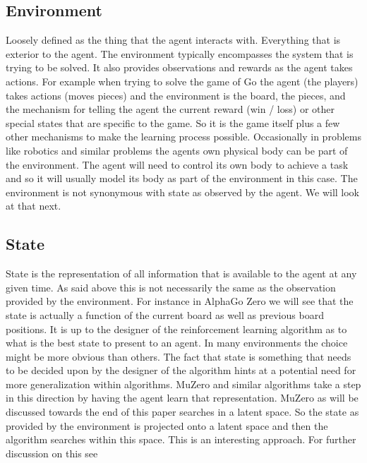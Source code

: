     \subsection{Environment}
    
    Loosely defined as the thing that the agent interacts with. Everything that is exterior to the agent. The environment typically encompasses the system that is trying to be solved. It also provides observations and rewards as the agent takes actions. For example when trying to solve the game of Go the agent (the players) takes actions (moves pieces) and the environment is the board, the pieces, and the mechanism for telling the agent the current reward (win / loss) or other special states that are specific to the game. So it is the game itself plus a few other mechanisms to make the learning process possible. Occasionally in problems like robotics and similar problems the agents own physical body can be part of the environment. The agent will need to control its own body to achieve a task and so it will usually model its body as part of the environment in this case. The environment is not synonymous with state as observed by the agent. We will look at that next. 
    
    \subsection{State}
    
    State is the representation of all information that is available to the agent at any given time. As said above this is not necessarily the same as the observation provided by the environment. For instance in AlphaGo Zero we will see that the state is actually a function of the current board as well as previous board positions. It is up to the designer of the reinforcement learning algorithm as to what is the best state to present to an agent. In many environments the choice might be more obvious than others. 
    The fact that state is something that needs to be decided upon by the designer of the algorithm hints at a potential need for more generalization within algorithms. MuZero and similar algorithms take a step in this direction by having the agent learn that representation. MuZero as will be discussed towards the end of this paper searches in a latent space. So the state as provided by the environment is projected onto a latent space and then the algorithm searches within this space. This is an interesting approach. For further discussion on this see \cite{predictron,muzero}
    
